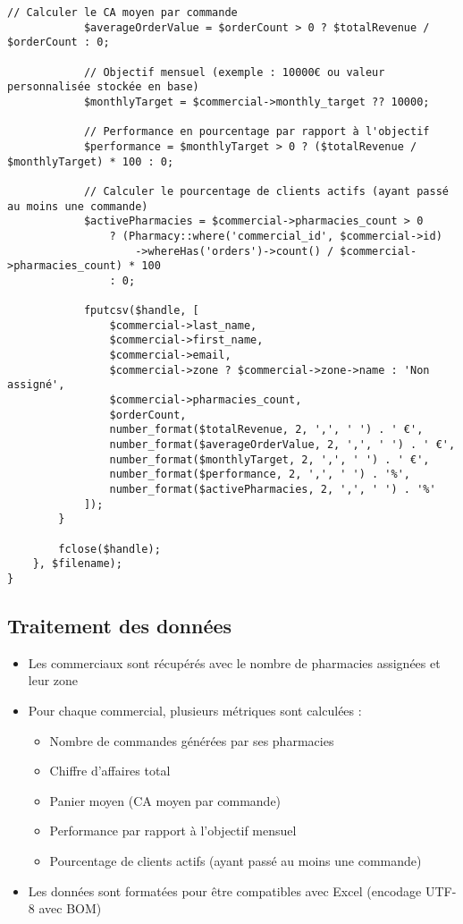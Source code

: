 \documentclass[12pt,a4paper]{article}
\begin{document}
\begin{lstlisting}[caption=Méthode exportAllCommercialsPerformance]
            // Calculer le CA moyen par commande
            $averageOrderValue = $orderCount > 0 ? $totalRevenue / $orderCount : 0;
            
            // Objectif mensuel (exemple : 10000€ ou valeur personnalisée stockée en base)
            $monthlyTarget = $commercial->monthly_target ?? 10000;
            
            // Performance en pourcentage par rapport à l'objectif
            $performance = $monthlyTarget > 0 ? ($totalRevenue / $monthlyTarget) * 100 : 0;
            
            // Calculer le pourcentage de clients actifs (ayant passé au moins une commande)
            $activePharmacies = $commercial->pharmacies_count > 0 
                ? (Pharmacy::where('commercial_id', $commercial->id)
                    ->whereHas('orders')->count() / $commercial->pharmacies_count) * 100 
                : 0;
            
            fputcsv($handle, [
                $commercial->last_name,
                $commercial->first_name,
                $commercial->email,
                $commercial->zone ? $commercial->zone->name : 'Non assigné',
                $commercial->pharmacies_count,
                $orderCount,
                number_format($totalRevenue, 2, ',', ' ') . ' €',
                number_format($averageOrderValue, 2, ',', ' ') . ' €',
                number_format($monthlyTarget, 2, ',', ' ') . ' €',
                number_format($performance, 2, ',', ' ') . '%',
                number_format($activePharmacies, 2, ',', ' ') . '%'
            ]);
        }
        
        fclose($handle);
    }, $filename);
}
\end{lstlisting}

\subsection{Traitement des données}
\begin{itemize}
    \item Les commerciaux sont récupérés avec le nombre de pharmacies assignées et leur zone
    \item Pour chaque commercial, plusieurs métriques sont calculées :
    \begin{itemize}
        \item Nombre de commandes générées par ses pharmacies
        \item Chiffre d'affaires total
        \item Panier moyen (CA moyen par commande)
        \item Performance par rapport à l'objectif mensuel
        \item Pourcentage de clients actifs (ayant passé au moins une commande)
    \end{itemize}
    \item Les données sont formatées pour être compatibles avec Excel (encodage UTF-8 avec BOM)
\end{itemize}
\end{document}
